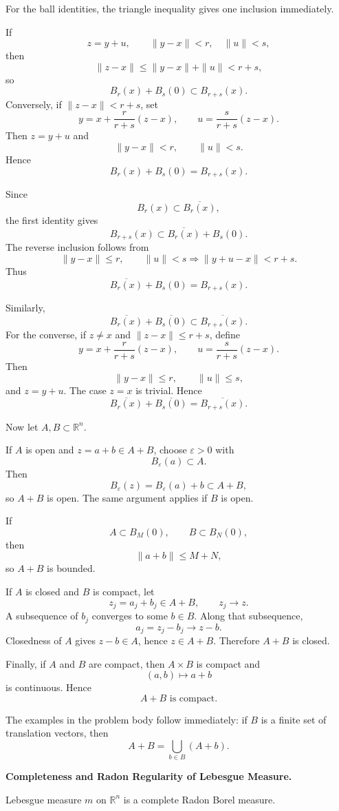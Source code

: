 \begin{solution}
For the ball identities, the triangle inequality gives one inclusion immediately.

If
\[
z=y+u,
\qquad
\|y-x\|<r,\quad \|u\|<s,
\]
then
\[
\|z-x\|
\le
\|y-x\|+\|u\|
<
r+s,
\]
so
\[
B_r(x)+B_s(0)\subset B_{r+s}(x).
\]
Conversely, if \(\|z-x\|<r+s\), set
\[
y=x+\frac{r}{r+s}(z-x),
\qquad
u=\frac{s}{r+s}(z-x).
\]
Then \(z=y+u\) and
\[
\|y-x\|<r,\qquad \|u\|<s.
\]
Hence
\[
\boxed{B_r(x)+B_s(0)=B_{r+s}(x)}.
\]

Since
\[
B_r(x)\subset\overline{B_r(x)},
\]
the first identity gives
\[
B_{r+s}(x)
\subset
\overline{B_r(x)}+B_s(0).
\]
The reverse inclusion follows from
\[
\|y-x\|\le r,\qquad \|u\|<s
\Longrightarrow
\|y+u-x\|<r+s.
\]
Thus
\[
\boxed{
\overline{B_r(x)}+B_s(0)=B_{r+s}(x).
}
\]

Similarly,
\[
\overline{B_r(x)}+\overline{B_s(0)}
\subset
\overline{B_{r+s}(x)}.
\]
For the converse, if \(z\neq x\) and \(\|z-x\|\le r+s\), define
\[
y=x+\frac{r}{r+s}(z-x),
\qquad
u=\frac{s}{r+s}(z-x).
\]
Then
\[
\|y-x\|\le r,\qquad \|u\|\le s,
\]
and \(z=y+u\). The case \(z=x\) is trivial. Hence
\[
\boxed{
\overline{B_r(x)}+\overline{B_s(0)}
=
\overline{B_{r+s}(x)}.
}
\]

Now let \(A,B\subset\mathbb R^n\).

If \(A\) is open and \(z=a+b\in A+B\), choose \(\varepsilon>0\) with
\[
B_\varepsilon(a)\subset A.
\]
Then
\[
B_\varepsilon(z)
=
B_\varepsilon(a)+b
\subset A+B,
\]
so \(A+B\) is open. The same argument applies if \(B\) is open.

If
\[
A\subset B_M(0),
\qquad
B\subset B_N(0),
\]
then
\[
\|a+b\|\le M+N,
\]
so \(A+B\) is bounded.

If \(A\) is closed and \(B\) is compact, let
\[
z_j=a_j+b_j\in A+B,
\qquad
z_j\to z.
\]
A subsequence of \(b_j\) converges to some \(b\in B\). Along that subsequence,
\[
a_j=z_j-b_j\to z-b.
\]
Closedness of \(A\) gives \(z-b\in A\), hence \(z\in A+B\). Therefore \(A+B\) is closed.

Finally, if \(A\) and \(B\) are compact, then \(A\times B\) is compact and
\[
(a,b)\longmapsto a+b
\]
is continuous. Hence
\[
\boxed{A+B\text{ is compact}.}
\]

The examples in the problem body follow immediately: if \(B\) is a finite set of translation vectors, then
\[
A+B=\bigcup_{b\in B}(A+b).
\]
\end{solution}


\begin{problem}[CP-II-0145]
\label{prob:cp-ii-0145}
\textbf{Completeness and Radon Regularity of Lebesgue Measure.}

\hspace*{1.5em}Lebesgue measure $m$ on $\mathbb{R}^n$ is a complete Radon Borel measure.
\end{problem}

